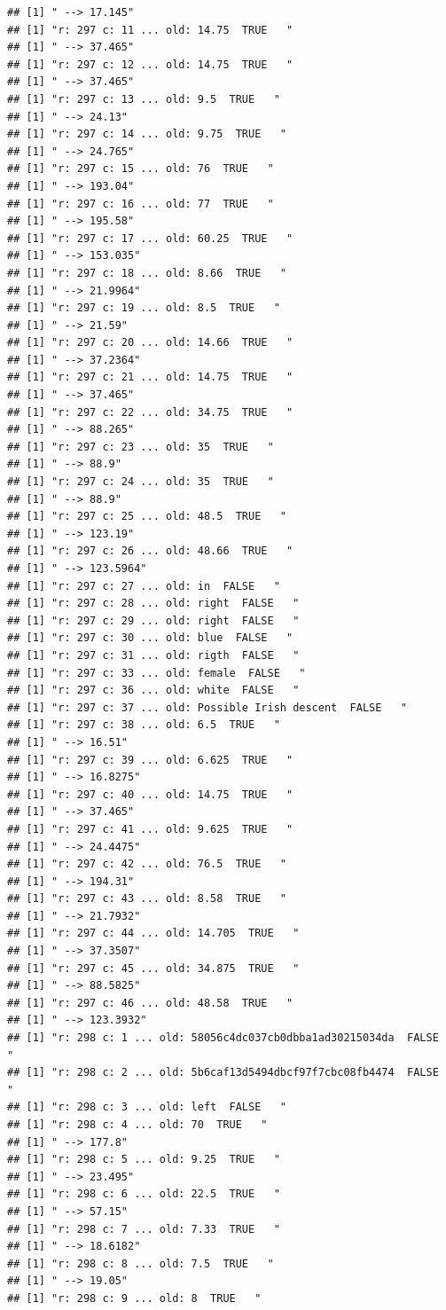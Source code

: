 \documentclass[]{article}
\begin{document}
\begin{verbatim}
## [1] " --> 17.145"
## [1] "r: 297 c: 11 ... old: 14.75  TRUE   "
## [1] " --> 37.465"
## [1] "r: 297 c: 12 ... old: 14.75  TRUE   "
## [1] " --> 37.465"
## [1] "r: 297 c: 13 ... old: 9.5  TRUE   "
## [1] " --> 24.13"
## [1] "r: 297 c: 14 ... old: 9.75  TRUE   "
## [1] " --> 24.765"
## [1] "r: 297 c: 15 ... old: 76  TRUE   "
## [1] " --> 193.04"
## [1] "r: 297 c: 16 ... old: 77  TRUE   "
## [1] " --> 195.58"
## [1] "r: 297 c: 17 ... old: 60.25  TRUE   "
## [1] " --> 153.035"
## [1] "r: 297 c: 18 ... old: 8.66  TRUE   "
## [1] " --> 21.9964"
## [1] "r: 297 c: 19 ... old: 8.5  TRUE   "
## [1] " --> 21.59"
## [1] "r: 297 c: 20 ... old: 14.66  TRUE   "
## [1] " --> 37.2364"
## [1] "r: 297 c: 21 ... old: 14.75  TRUE   "
## [1] " --> 37.465"
## [1] "r: 297 c: 22 ... old: 34.75  TRUE   "
## [1] " --> 88.265"
## [1] "r: 297 c: 23 ... old: 35  TRUE   "
## [1] " --> 88.9"
## [1] "r: 297 c: 24 ... old: 35  TRUE   "
## [1] " --> 88.9"
## [1] "r: 297 c: 25 ... old: 48.5  TRUE   "
## [1] " --> 123.19"
## [1] "r: 297 c: 26 ... old: 48.66  TRUE   "
## [1] " --> 123.5964"
## [1] "r: 297 c: 27 ... old: in  FALSE   "
## [1] "r: 297 c: 28 ... old: right  FALSE   "
## [1] "r: 297 c: 29 ... old: right  FALSE   "
## [1] "r: 297 c: 30 ... old: blue  FALSE   "
## [1] "r: 297 c: 31 ... old: rigth  FALSE   "
## [1] "r: 297 c: 33 ... old: female  FALSE   "
## [1] "r: 297 c: 36 ... old: white  FALSE   "
## [1] "r: 297 c: 37 ... old: Possible Irish descent  FALSE   "
## [1] "r: 297 c: 38 ... old: 6.5  TRUE   "
## [1] " --> 16.51"
## [1] "r: 297 c: 39 ... old: 6.625  TRUE   "
## [1] " --> 16.8275"
## [1] "r: 297 c: 40 ... old: 14.75  TRUE   "
## [1] " --> 37.465"
## [1] "r: 297 c: 41 ... old: 9.625  TRUE   "
## [1] " --> 24.4475"
## [1] "r: 297 c: 42 ... old: 76.5  TRUE   "
## [1] " --> 194.31"
## [1] "r: 297 c: 43 ... old: 8.58  TRUE   "
## [1] " --> 21.7932"
## [1] "r: 297 c: 44 ... old: 14.705  TRUE   "
## [1] " --> 37.3507"
## [1] "r: 297 c: 45 ... old: 34.875  TRUE   "
## [1] " --> 88.5825"
## [1] "r: 297 c: 46 ... old: 48.58  TRUE   "
## [1] " --> 123.3932"
## [1] "r: 298 c: 1 ... old: 58056c4dc037cb0dbba1ad30215034da  FALSE   "
## [1] "r: 298 c: 2 ... old: 5b6caf13d5494dbcf97f7cbc08fb4474  FALSE   "
## [1] "r: 298 c: 3 ... old: left  FALSE   "
## [1] "r: 298 c: 4 ... old: 70  TRUE   "
## [1] " --> 177.8"
## [1] "r: 298 c: 5 ... old: 9.25  TRUE   "
## [1] " --> 23.495"
## [1] "r: 298 c: 6 ... old: 22.5  TRUE   "
## [1] " --> 57.15"
## [1] "r: 298 c: 7 ... old: 7.33  TRUE   "
## [1] " --> 18.6182"
## [1] "r: 298 c: 8 ... old: 7.5  TRUE   "
## [1] " --> 19.05"
## [1] "r: 298 c: 9 ... old: 8  TRUE   "

\end{verbatim}
\end{document}
